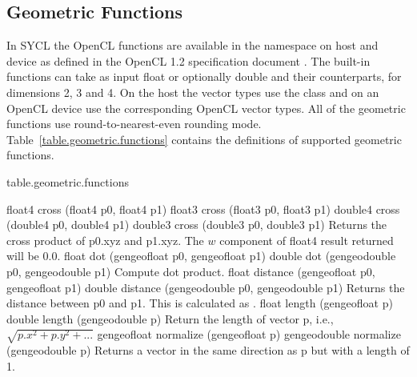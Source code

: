 \subsection{Geometric Functions}

In SYCL the OpenCL  functions are available in the namespace
 on host and device as defined in the OpenCL 1.2 specification
document \cite[par. 6.12.5]{opencl12}. The built-in functions can take as input
float or optionally double and their  counterparts, for dimensions
2, 3 and 4. On the host the vector types use the
 class and on an OpenCL device use the
corresponding OpenCL vector types. All of the geometric functions use
round-to-nearest-even rounding mode. Table~\ref{table.geometric.functions}
contains the definitions of supported geometric functions.

 
{table.geometric.functions}

\addRowFourSL
{float4 cross (float4 p0, float4 p1)}
{float3 cross (float3 p0, float3 p1)}
{double4 cross (double4 p0, double4 p1)}
{double3 cross (double3 p0, double3 p1)}
{
Returns the cross product of p0.xyz and p1.xyz. The
$w$ component of float4 result returned will be 0.0.
}
\addRowTwoSL
{ float dot (gengeofloat p0, gengeofloat p1)}
{ double dot (gengeodouble p0, gengeodouble p1) }
{
Compute dot product.
}
\addRowTwoSL
{float distance (gengeofloat p0, gengeofloat p1)}
{double distance (gengeodouble p0, gengeodouble p1)}
{
Returns the distance between p0 and p1. This is
calculated as .
}
\addRowTwoSL
{float length (gengeofloat p)}
{double length (gengeodouble p)}
{
Return the length of vector p, i.e.,
$\sqrt{ p.x^2 + p.y^2 + ...}$
}
\addRowTwoSL
{gengeofloat normalize (gengeofloat p)}
{gengeodouble normalize (gengeodouble p)}
{
Returns a vector in the same direction as p but with a
length of 1.
}

